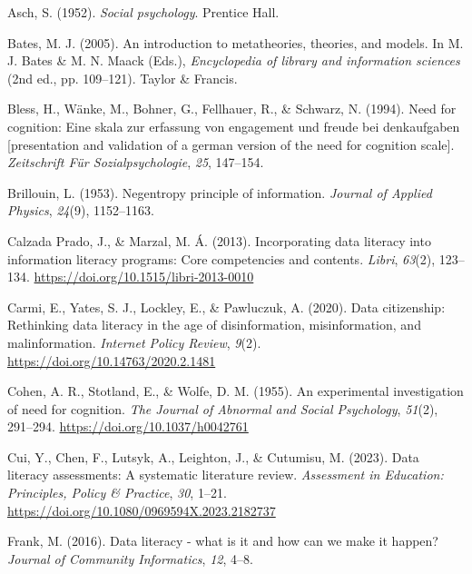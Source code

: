 \documentclass[
  12pt,
  a4paper,
  twoside]{article}
\newlength{\cslhangindent}
\newenvironment{CSLReferences}[2] %
 {\begin{list}{}{%
  \setlength{\itemindent}{0pt}
  \setlength{\leftmargin}{0pt}
  \setlength{\parsep}{0pt}
  \ifodd #1
   \setlength{\leftmargin}{\cslhangindent}
   \setlength{\itemindent}{-1\cslhangindent}
  \fi
  \setlength{\itemsep}{#2\baselineskip}}}
 {\end{list}}
\begin{document}
\label{refs}
\begin{CSLReferences}{1}{0}
Asch, S. (1952). \emph{Social psychology}. Prentice Hall.

Bates, M. J. (2005). An introduction to metatheories, theories, and
models. In M. J. Bates \& M. N. Maack (Eds.), \emph{Encyclopedia of
library and information sciences} (2nd ed., pp. 109--121). Taylor \&
Francis.

Bless, H., Wänke, M., Bohner, G., Fellhauer, R., \& Schwarz, N. (1994).
Need for cognition: Eine skala zur erfassung von engagement und freude
bei denkaufgaben {[}presentation and validation of a german version of
the need for cognition scale{]}. \emph{Zeitschrift Für
Sozialpsychologie}, \emph{25}, 147--154.

Brillouin, L. (1953). Negentropy principle of information. \emph{Journal
of Applied Physics}, \emph{24}(9), 1152--1163.

Calzada Prado, J., \& Marzal, M. Á. (2013). Incorporating data literacy
into information literacy programs: Core competencies and contents.
\emph{Libri}, \emph{63}(2), 123--134.
\url{https://doi.org/10.1515/libri-2013-0010}

Carmi, E., Yates, S. J., Lockley, E., \& Pawluczuk, A. (2020). Data
citizenship: Rethinking data literacy in the age of disinformation,
misinformation, and malinformation. \emph{Internet Policy Review},
\emph{9}(2). \url{https://doi.org/10.14763/2020.2.1481}

Cohen, A. R., Stotland, E., \& Wolfe, D. M. (1955). An experimental
investigation of need for cognition. \emph{The Journal of Abnormal and
Social Psychology}, \emph{51}(2), 291--294.
\url{https://doi.org/10.1037/h0042761}

Cui, Y., Chen, F., Lutsyk, A., Leighton, J., \& Cutumisu, M. (2023).
Data literacy assessments: A systematic literature review.
\emph{Assessment in Education: Principles, Policy \& Practice},
\emph{30}, 1--21. \url{https://doi.org/10.1080/0969594X.2023.2182737}

Frank, M. (2016). Data literacy - what is it and how can we make it
happen? \emph{Journal of Community Informatics}, \emph{12}, 4--8.


\end{CSLReferences}
\end{document}
